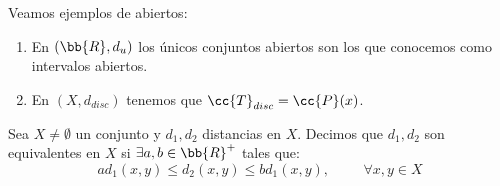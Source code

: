 \begin{ejemplo} Veamos ejemplos de abiertos:
\begin{enumerate}
    \item En $(\bb{R}, d_u)$ los únicos conjuntos abiertos son los que conocemos como intervalos abiertos.

    \item En $(X,d_{disc})$ tenemos que $\cc{T}_{disc}=\cc{P}(x)$.
\end{enumerate}
\end{ejemplo}

\begin{definicion}
    Sea $X\neq \emptyset$ un conjunto y $d_1, d_2$ distancias en $X$. Decimos que $d_1, d_2$ son equivalentes en $X$ si $\exists a,b\in \bb{R}^+$ tales que:
    \begin{equation*}
         ad_1(x,y) \leq d_2(x,y)\leq bd_1(x,y),\hspace{1cm} \forall x,y\in X
    \end{equation*}
\end{definicion}


